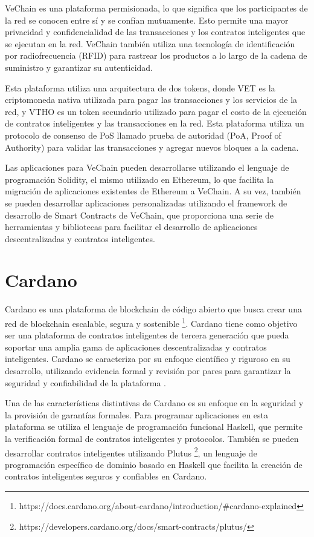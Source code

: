 \documentclass[main.tex]{subfiles}
\begin{document}
VeChain es una plataforma permisionada, lo que significa que los participantes de la red se conocen entre sí y se confían mutuamente. Esto permite una mayor privacidad y confidencialidad de las transacciones y los contratos inteligentes que se ejecutan en la red. VeChain también utiliza una tecnología de identificación por radiofrecuencia (RFID) para rastrear los productos a lo largo de la cadena de suministro y garantizar su autenticidad.

Esta plataforma utiliza una arquitectura de dos tokens, donde VET es la criptomoneda nativa utilizada para pagar las transacciones y los servicios de la red, y VTHO es un token secundario utilizado para pagar el costo de la ejecución de contratos inteligentes y las transacciones en la red. Esta plataforma utiliza un protocolo de consenso de PoS llamado prueba de autoridad (PoA, Proof of Authority) para validar las transacciones y agregar nuevos bloques a la cadena.

Las aplicaciones para VeChain pueden desarrollarse utilizando el lenguaje de programación Solidity, el mismo utilizado en Ethereum, lo que facilita la migración de aplicaciones existentes de Ethereum a VeChain. A su vez, también se pueden desarrollar aplicaciones personalizadas utilizando el framework de desarrollo de Smart Contracts de VeChain, que proporciona una serie de herramientas y bibliotecas para facilitar el desarrollo de aplicaciones descentralizadas y contratos inteligentes.

\section{Cardano}

Cardano es una plataforma de blockchain de código abierto que busca crear una red de blockchain escalable, segura y sostenible \footnote{https://docs.cardano.org/about-cardano/introduction/\#cardano-explained}. Cardano tiene como objetivo ser una plataforma de contratos inteligentes de tercera generación que pueda soportar una amplia gama de aplicaciones descentralizadas y contratos inteligentes. Cardano se caracteriza por su enfoque científico y riguroso en su desarrollo, utilizando evidencia formal y revisión por pares para garantizar la seguridad y confiabilidad de la plataforma \cite{hoskinson2017we}.

Una de las características distintivas de Cardano es su enfoque en la seguridad y la provisión de garantías formales. Para programar aplicaciones en esta plataforma se utiliza el lenguaje de programación funcional Haskell, que permite la verificación formal de contratos inteligentes y protocolos. También se pueden desarrollar contratos inteligentes utilizando Plutus \cite{chakravarty2019functional}\footnote{https://developers.cardano.org/docs/smart-contracts/plutus/}, un lenguaje de programación específico de dominio basado en Haskell que facilita la creación de contratos inteligentes seguros y confiables en Cardano.
\end{document}
